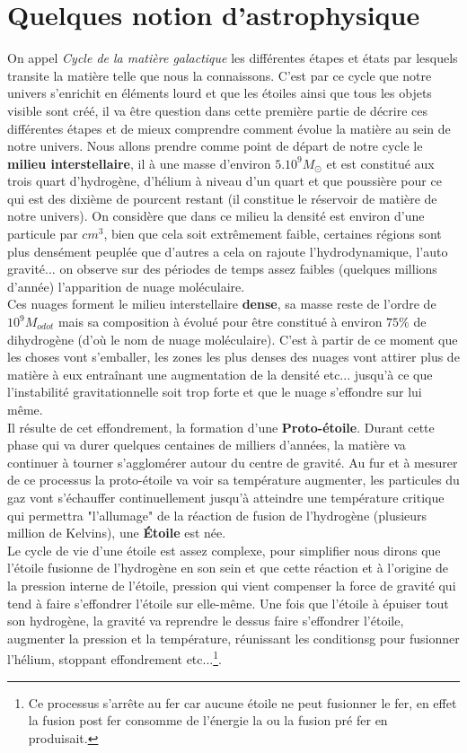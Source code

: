 \documentclass[a4paper]{rapport}
\begin{document}
\part{Quelques notion d'astrophysique}
On appel \textit{Cycle de la matière galactique} les différentes étapes et états par lesquels transite la matière telle que nous la connaissons. C'est par ce cycle que notre univers s’enrichit en éléments lourd et que les étoiles ainsi que tous les objets visible sont créé, il va être question dans cette première partie de décrire ces différentes étapes et de mieux comprendre comment évolue la matière au sein de notre univers.
\nl
Nous allons prendre comme point de départ de notre cycle le \textbf{milieu interstellaire}, il à une masse d'environ $5.10^{9}M_{\odot}$ et est constitué aux trois quart d'hydrogène, d'hélium à niveau d'un quart et que poussière pour ce qui est des dixième de pourcent restant (il constitue le réservoir de matière de notre univers). On considère que dans ce milieu la densité est environ d'une particule par $cm^3$, bien que cela soit extrêmement faible, certaines régions sont plus densément peuplée que d'autres a cela on rajoute l'hydrodynamique, l'auto gravité... on observe sur des périodes de temps assez faibles (quelques millions d'année) l'apparition de nuage moléculaire.\\ Ces nuages forment le milieu interstellaire \textbf{dense}, sa masse reste de l'ordre de $10^{9}M_{odot}$ mais sa composition à évolué pour être constitué à environ $75\%$ de dihydrogène (d’où le nom de nuage moléculaire). C'est à partir de ce moment que les choses vont s'emballer, les zones les plus denses des nuages vont attirer plus de matière à eux entraînant une augmentation de la densité etc... jusqu’à ce que l'instabilité gravitationnelle soit trop forte et que le nuage s’effondre sur lui même.\\
Il résulte de cet effondrement, la formation d'une \textbf{Proto-étoile}. Durant cette phase qui va durer quelques centaines de milliers d'années, la matière va continuer à tourner s'agglomérer autour du centre de gravité. Au fur et à mesurer de ce processus la proto-étoile va voir sa température augmenter, les particules du gaz vont s'échauffer continuellement jusqu’à atteindre une température critique qui permettra "l'allumage" de la réaction de fusion de l'hydrogène (plusieurs million de Kelvins), une \textbf{Étoile} est née.\\
Le cycle de vie d'une étoile est assez complexe, pour simplifier nous dirons que l'étoile fusionne de l’hydrogène en son sein et que cette réaction et à l'origine de la pression interne de l'étoile, pression qui vient compenser la force de gravité qui tend à faire s’effondrer l'étoile sur elle-même. Une fois que l'étoile à épuiser tout son hydrogène, la gravité va reprendre le dessus faire s’effondrer l'étoile, augmenter la pression et la température, réunissant les conditionsg pour fusionner l'hélium, stoppant effondrement etc...\footnote{Ce processus s’arrête au fer car aucune étoile ne peut fusionner le fer, en effet la fusion post fer consomme de l'énergie la ou la fusion pré fer en produisait.}.\\
\end{document}
